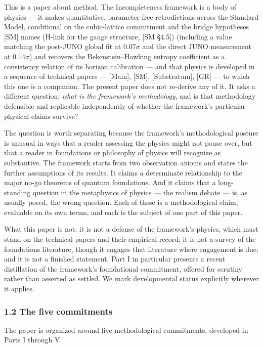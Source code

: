 \documentclass[
]{article}
\begin{document}
This is a paper about method. The Incompleteness framework is a body of
physics --- it makes quantitative, parameter-free retrodictions across
the Standard Model, conditional on the cubic-lattice commitment and the
bridge hypotheses {[}SM{]} names (H-link for the gauge structure, {[}SM
§4.5{]}) (including a value matching the post-JUNO global fit at
\(0.07\sigma\) and the direct JUNO measurement at \(0.14\sigma\)) and
recovers the Bekenstein--Hawking entropy coefficient as a consistency
relation of its horizon calibration --- and that physics is developed in
a sequence of technical papers --- {[}Main{]}, {[}SM{]},
{[}Substratum{]}, {[}GR{]} --- to which this one is a companion. The
present paper does not re-derive any of it. It asks a different
question: \emph{what is the framework's methodology}, and is that
methodology defensible and replicable independently of whether the
framework's particular physical claims survive?

The question is worth separating because the framework's methodological
posture is unusual in ways that a reader assessing the physics might not
pause over, but that a reader in foundations or philosophy of physics
will recognize as substantive. The framework starts from two observation
axioms and states the further assumptions of its results. It claims a
determinate relationship to the major no-go theorems of quantum
foundations. And it claims that a long-standing question in the
metaphysics of physics --- the realism debate --- is, as usually posed,
the wrong question. Each of these is a methodological claim, evaluable
on its own terms, and each is the subject of one part of this paper.

What this paper is not: it is not a defense of the framework's physics,
which must stand on the technical papers and their empirical record; it
is not a survey of the foundations literature, though it engages that
literature where engagement is due; and it is not a finished statement.
Part I in particular presents a recent distillation of the framework's
foundational commitment, offered for scrutiny rather than asserted as
settled. We mark developmental status explicitly wherever it applies.

\hypertarget{the-five-commitments}{%
\subsubsection{1.2 The five commitments}\label{the-five-commitments}}

The paper is organized around five methodological commitments, developed
in Parts I through V.
\end{document}
